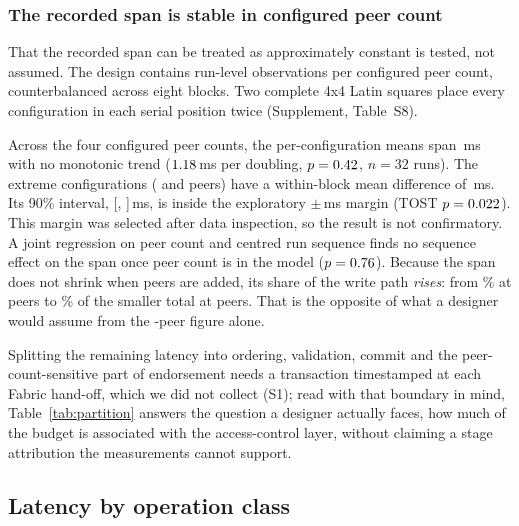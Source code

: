 \documentclass[a4paper,fleqn]{cas-dc}
\begin{document}


\subsubsection{The recorded span is stable in configured peer count}
\label{subsubsec:acinvariance}

That the recorded span can be treated as approximately constant is tested,
not assumed. The design contains \PartRunsPerConfig{} run-level observations
per configured peer count, counterbalanced across eight blocks. Two complete
4x4 Latin squares place every configuration in each serial position twice
(Supplement, Table~S8).

Across the four configured peer counts, the per-configuration means span
\PartSpread\,ms with no monotonic trend ($1.18$\,ms per doubling,
$p=0.42$, $n=32$ runs). The extreme configurations
(\ScaleMinPeers{} and \ScaleMaxPeers{} peers) have a within-block mean
difference of \PartTostDiff\,ms. Its 90\% interval,
[\PartTostLow, \PartTostHigh]\,ms, is inside the exploratory
$\pm$\DecisionMargin\,ms margin (TOST $p=0.022$). This margin was
selected after data inspection, so the result is not confirmatory. A joint
regression on peer count and centred run
sequence finds no sequence effect on the span once peer count is in the
model ($p=0.76$). Because the span does not
shrink when peers are added, its share of the write path \emph{rises}: from
\PartAccessPct\% at \ScaleMinPeers{} peers to \PartAccessPctAtMax\% of the
smaller total at \ScaleMaxPeers{} peers. That is the opposite of what a
designer would assume from the \ScaleMinPeers-peer figure alone.

Splitting the remaining latency into ordering, validation, commit and the
peer-count-sensitive part of endorsement needs a transaction timestamped at
each Fabric hand-off, which we did not collect (S1); read with that
boundary in mind, Table~\ref{tab:partition} answers the question a designer
actually faces, how much of the budget is associated with the
access-control layer, without claiming a stage attribution the
measurements cannot support.

\subsection{Latency by operation class}
\label{subsec:byclass}
\end{document}
